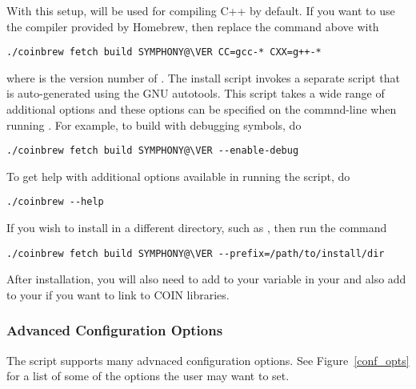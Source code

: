 With this setup,  will be used for compiling C++ by default. If
you want to use the  compiler provided by Homebrew, then replace the
 command above with

{\color{brown}
\begin{verbatim}
./coinbrew fetch build SYMPHONY@\VER CC=gcc-* CXX=g++-*
\end{verbatim}
}
where \code{*} is the version number of . 
The install script invokes a separate  script that is
auto-generated using the GNU autotools. This script takes a wide range of
additional options and these options can be specified on the commnd-line when
running . For example, to build with debugging symbols,
do

{\color{brown}
\begin{verbatim}
./coinbrew fetch build SYMPHONY@\VER --enable-debug
\end{verbatim}
}

To get help with additional options available in running the script, do

{\color{brown}
\begin{verbatim}
./coinbrew --help
\end{verbatim}
}

If you wish to install in a different directory, such as , then run
the command

{\color{brown}
\begin{verbatim}
./coinbrew fetch build SYMPHONY@\VER --prefix=/path/to/install/dir
\end{verbatim}
}

After installation, you will also need to add  to your
 variable in your  and also add 
to your  if you want to link to COIN libraries. 

\subsubsection{Advanced Configuration Options}

The  script supports many advnaced configuration
options. See Figure~\ref{conf_opts} for a list of some of the options the user
may want to set.  
 
